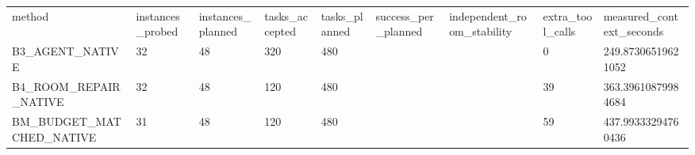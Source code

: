 \begin{tabular}{lllllllll}
method & instances\_probed & instances\_planned & tasks\_accepted & tasks\_planned & success\_per\_planned & independent\_room\_stability & extra\_tool\_calls & measured\_context\_seconds \\
B3\_AGENT\_NATIVE & 32 & 48 & 320 & 480 &  &  & 0 & 249.87306519621052 \\
B4\_ROOM\_REPAIR\_NATIVE & 32 & 48 & 120 & 480 &  &  & 39 & 363.39610879984684 \\
BM\_BUDGET\_MATCHED\_NATIVE & 31 & 48 & 120 & 480 &  &  & 59 & 437.99333294760436 \\
\end{tabular}
